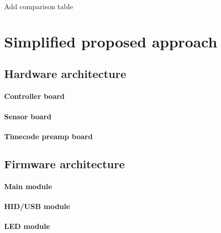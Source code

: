 \documentclass[a4paper,10pt]{article}
\begin{document}
\begin{multicols}{2}

\TODO Add comparison table


\section{Simplified proposed approach}

\TODO


\subsection{Hardware architecture}

\TODO


\paragraph{Controller board}
\TODO


\paragraph{Sensor board}
\TODO


\paragraph{Timecode preamp board}
\TODO


\subsection{Firmware architecture}

\TODO


\paragraph{Main module}
\TODO


\paragraph{HID/USB module}
\TODO


\paragraph{LED module}
\TODO



\end{multicols}
\end{document}
